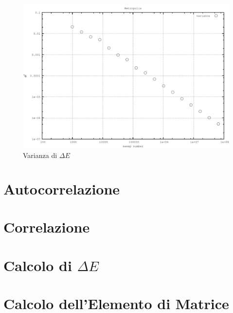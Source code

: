 \documentclass[a4paper,11pt]{report}
\begin{document}
\begin{figure}[h]
\centering
\includegraphics[width=\textwidth]{variance}
\caption{Varianza di $\Delta E$}
\label{fig:variance}
\end{figure}

\section{Autocorrelazione}
\section{Correlazione}
\section{Calcolo di $\Delta E$}
\section{Calcolo dell'Elemento di Matrice}
\end{document}
